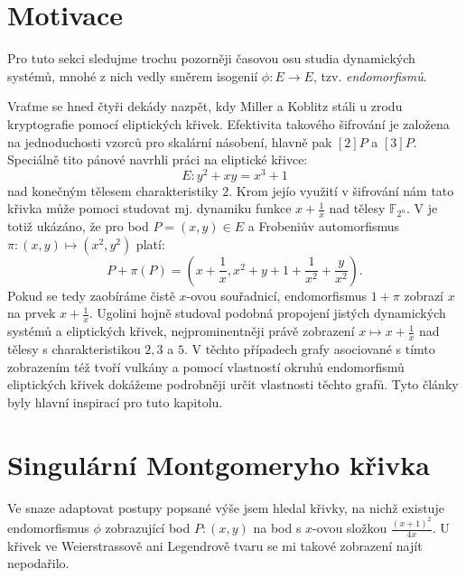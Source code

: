 \documentclass[12pt]{report}
\begin{document}
\section{Motivace}

Pro tuto sekci sledujme trochu pozorněji časovou osu studia dynamických systémů, mnohé z nich vedly směrem isogenií $\phi : E \longrightarrow E$, tzv. \textit{endomorfismů}.

Vraťme se hned čtyři dekády nazpět, kdy Miller a Koblitz stáli u zrodu kryptografie pomocí eliptických křivek. Efektivita takového šifrování je založena na jednoduchosti vzorců pro skalární násobení, hlavně pak $[2]P$ a $[3]P$. Speciálně tito pánové navrhli práci na eliptické křivce:
$$E : y^2 + xy = x^3 + 1$$
nad konečným tělesem charakteristiky $2$. Krom jejío využití v šifrování nám tato křivka může pomoci studovat mj. dynamiku funkce $x + \frac{1}{x}$ nad tělesy $\mathbb{F}_{2^n}$. V \cite{Ugolini} je totiž ukázáno, že pro bod $P = (x,y) \in E$ a Frobeniův automorfismus  $\pi : (x,y) \longmapsto (x^2,y^2)$ platí:
$$P + \pi (P) = \left(x + \frac{1}{x} ,  x^2 + y + 1 + \frac{1}{x^2} + \frac{y}{x^2} \right).$$
Pokud se tedy zaobíráme čistě $x$-ovou souřadnicí, endomorfismus $1+\pi$ zobrazí $x$ na prvek $x+\frac{1}{x}$. Ugolini \cite{Ugolini,Ugolini2,Ugolini3,Ugolini4} hojně studoval podobná propojení jistých dynamických systémů a eliptických křivek, nejprominentněji právě zobrazení $x \longmapsto x+\frac{1}{x}$ nad tělesy s charakteristikou $2,3$ a $5$. V těchto případech grafy asociované s tímto zobrazením též tvoří vulkány a pomocí vlastností okruhů endomorfismů eliptických křivek dokážeme podrobněji určit vlastnosti těchto grafů. Tyto články byly hlavní inspirací pro tuto kapitolu. 


\section{Singulární Montgomeryho křivka}

Ve snaze adaptovat postupy popsané výše jsem hledal křivky, na nichž existuje endomorfismus $\phi$ zobrazující bod $P : (x,y)$ na bod s $x$-ovou složkou $\frac{(x+1)^2}{4x}$. U křivek ve Weierstrassově ani Legendrově tvaru se mi takové zobrazení najít nepodařilo. 
\end{document}
